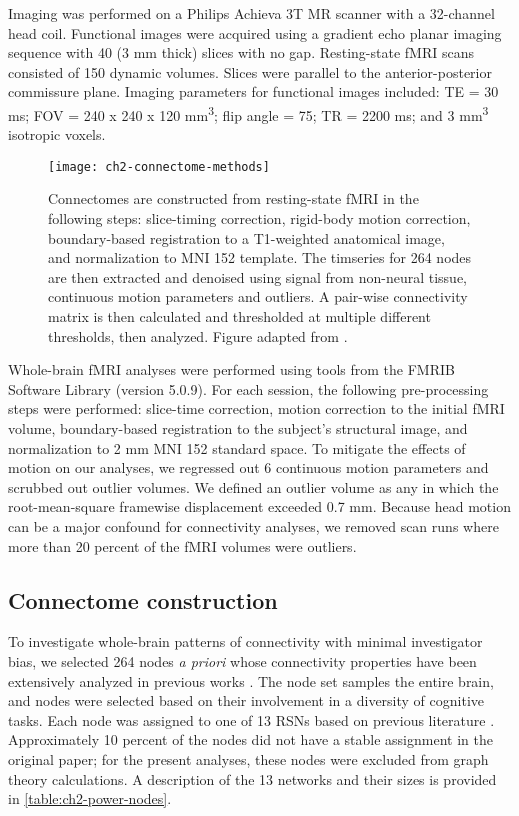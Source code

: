 Imaging was performed on a Philips Achieva 3T MR scanner with a 32-channel head coil. Functional images were acquired using a gradient echo planar imaging sequence with 40 (3 mm thick) slices with no gap. Resting-state fMRI scans consisted of 150 dynamic volumes. Slices were parallel to the anterior-posterior commissure plane. Imaging parameters for functional images included: TE = 30 ms; FOV = 240 x 240 x 120 mm\textsuperscript{3}; flip angle = 75\degree; TR = 2200 ms; and 3 mm\textsuperscript{3} isotropic voxels.

\begin{figure}[t]
    \centering
    \texttt{[image: ch2-connectome-methods]}
    \caption[Schematic for connectome construction.]{Connectomes are constructed from resting-state fMRI in the following steps: slice-timing correction, rigid-body motion correction, boundary-based registration to a T1-weighted anatomical image, and normalization to MNI 152 template. The timseries for 264 nodes are then extracted and denoised using signal from non-neural tissue, continuous motion parameters and outliers. A pair-wise connectivity matrix is then calculated and thresholded at multiple different thresholds, then analyzed. Figure adapted from \citep{Yang2018}.}
    \label{fig:ch2-connectome-methods}
\end{figure}

Whole-brain fMRI analyses were performed using tools from the FMRIB Software Library (version 5.0.9). For each session, the following pre-processing steps were performed:  slice-time correction, motion correction to the initial fMRI volume, boundary-based registration to the subject's structural image, and normalization to 2 mm MNI 152 standard space. To mitigate the effects of motion on our analyses, we regressed out 6 continuous motion parameters and scrubbed out outlier volumes. We defined an outlier volume as any in which the root-mean-square framewise displacement exceeded 0.7 mm. Because head motion can be a major confound for connectivity analyses, we removed scan runs where more than 20 percent of the fMRI volumes were outliers.

\subsection{Connectome construction}

To investigate whole-brain patterns of connectivity with minimal investigator bias, we selected 264 nodes \textit{a priori} whose connectivity properties have been extensively analyzed in previous works \citep{Power2011}. The node set samples the entire brain, and nodes were selected based on their involvement in a diversity of cognitive tasks. Each node was assigned to one of 13 RSNs based on previous literature \citep{Power2013}. Approximately 10 percent of the nodes did not have a stable assignment in the original paper; for the present analyses, these nodes were excluded from graph theory calculations. A description of the 13 networks and their sizes is provided in \ref{table:ch2-power-nodes}. 

